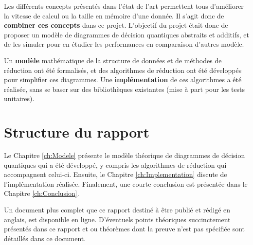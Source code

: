 Les différents concepts présentés dans l'état de l'art permettent tous d'améliorer la vitesse de calcul ou la taille en mémoire d'une donnée. Il s'agit donc de \textbf{combiner ces concepts} dans ce projet. L'objectif du projet était donc de proposer un modèle de diagrammes de décision quantiques abstraits et additifs, et de les simuler pour en étudier les performances en comparaison d'autres modèle.

Un \textbf{modèle} mathématique de la structure de données et de méthodes de réduction ont été formalisés, et des algorithmes de réduction ont été développés pour simplifier ces diagrammes. Une \textbf{implémentation} de ces algorithmes a été réalisée, sans se baser sur des bibliothèques existantes (mise à part pour les tests unitaires).

\section{Structure du rapport}
\label{sec:Structure}

Le Chapitre \ref{ch:Modele} présente le modèle théorique de diagrammes de décision quantiques qui a été développé, y compris les algorithmes de réduction qui accompagnent celui-ci. Ensuite, le Chapitre \ref{ch:Implementation} discute de l'implémentation réalisée. Finalement, une courte conclusion est présentée dans le Chapitre \ref{ch:Conclusion}.

Un document plus complet que ce rapport destiné à être publié et rédigé en anglais, est disponible en ligne. \cite{Leroy_2024} D'éventuels points théoriques succinctement présentés dans ce rapport et ou théorèmes dont la preuve n'est pas spécifiée sont détaillés dans ce document.

